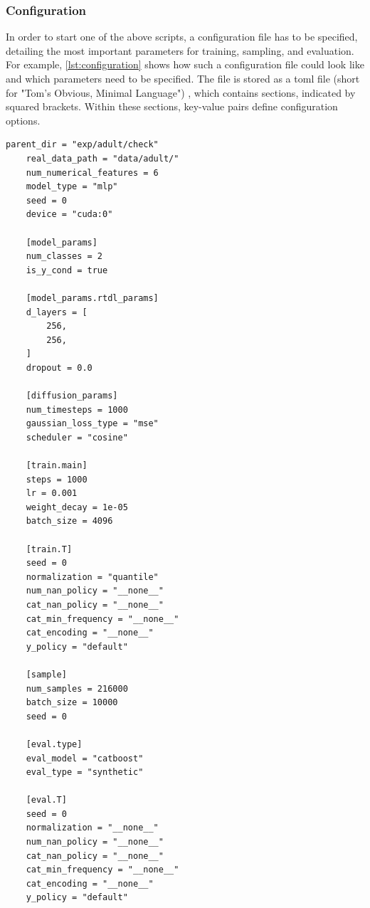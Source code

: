 \subsubsection[]{Configuration}

In order to start one of the above scripts, a configuration file has to be specified, detailing the most important parameters for training, sampling, and evaluation.
For example, \autoref{lst:configuration} shows how such a configuration file could look like and which parameters need to be specified.
The file is stored as a \gls{toml}  file (short for "Tom's Obvious, Minimal Language") \cite{werner2021TOMLTomObvious}, which contains sections, indicated by squared brackets. 
Within these sections, key-value pairs define configuration options.

\begin{lstlisting}[label={lst:configuration}, caption={Example Configuration File}]
    parent_dir = "exp/adult/check"
    real_data_path = "data/adult/"
    num_numerical_features = 6
    model_type = "mlp"
    seed = 0
    device = "cuda:0"

    [model_params]
    num_classes = 2
    is_y_cond = true

    [model_params.rtdl_params]
    d_layers = [
        256,
        256,
    ]
    dropout = 0.0

    [diffusion_params]
    num_timesteps = 1000
    gaussian_loss_type = "mse"
    scheduler = "cosine"

    [train.main]
    steps = 1000
    lr = 0.001
    weight_decay = 1e-05
    batch_size = 4096

    [train.T]
    seed = 0
    normalization = "quantile"
    num_nan_policy = "__none__"
    cat_nan_policy = "__none__"
    cat_min_frequency = "__none__"
    cat_encoding = "__none__"
    y_policy = "default"

    [sample]
    num_samples = 216000
    batch_size = 10000
    seed = 0

    [eval.type]
    eval_model = "catboost"
    eval_type = "synthetic"

    [eval.T]
    seed = 0
    normalization = "__none__"
    num_nan_policy = "__none__"
    cat_nan_policy = "__none__"
    cat_min_frequency = "__none__"
    cat_encoding = "__none__"
    y_policy = "default"
\end{lstlisting}


